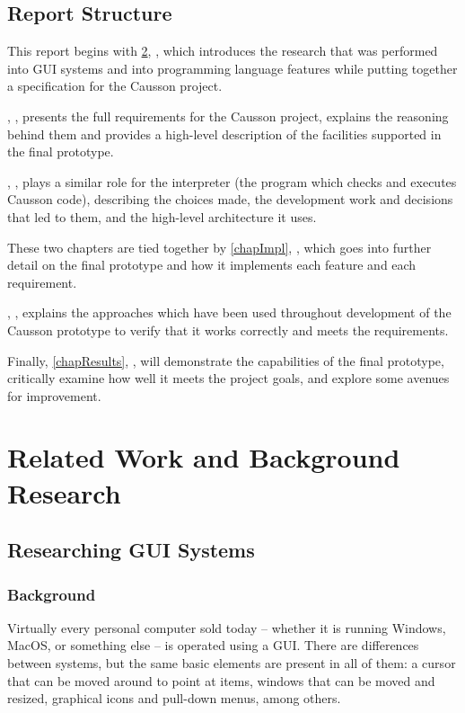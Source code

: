 \documentclass[11pt]{report}
\begin{document}
\section{Report Structure}

This report begins with \cref{chapBG}, \emph{}, which introduces the research that was performed into GUI systems and into programming language features while putting together a specification for the Causson project.

, \emph{}, presents the full requirements for the Causson project, explains the reasoning behind them and provides a high-level description of the facilities supported in the final prototype.

, \emph{}, plays a similar role for the interpreter (the program which checks and executes Causson code), describing the choices made, the development work and decisions that led to them, and the high-level architecture it uses.

These two chapters are tied together by \cref{chapImpl}, \emph{}, which goes into further detail on the final prototype and how it implements each feature and each requirement.

, \emph{}, explains the approaches which have been used throughout development of the Causson prototype to verify that it works correctly and meets the requirements.

Finally, \cref{chapResults}, \emph{}, will demonstrate the capabilities of the final prototype, critically examine how well it meets the project goals, and explore some avenues for improvement.

\chapter{Related Work and Background Research} \label{chapBG}

\section{Researching GUI Systems} \label{secGUI}

\subsection{Background}

Virtually every personal computer sold today – whether it is running Windows, MacOS, or something else – is operated using a GUI. There are differences between systems, but the same basic elements are present in all of them: a cursor that can be moved around to point at items, windows that can be moved and resized, graphical icons and pull-down menus, among others.\cite{GUIHistory}
\end{document}
